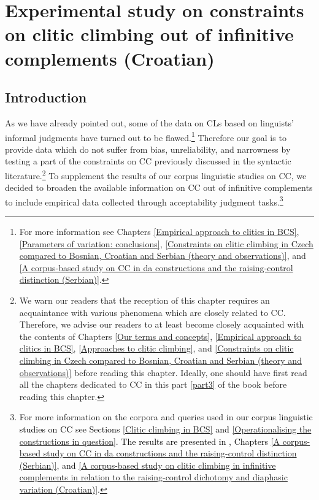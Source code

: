 
\chapter[Experimental study on clitic climbing out of infinitive complements]
        {Experimental study on constraints on clitic climbing out of infinitive complements (Croatian)}
\label{Experimental study on constraints on clitic climbing out of infinitive complements}

\largerpage
\section{Introduction}

As we have already pointed out, some of the data on CLs based on linguists’ informal judgments have turned out to be flawed.\footnote{For more information see Chapters \ref{Empirical approach to clitics in BCS}, \ref{Parameters of variation: conclusions}, \ref{Constraints on clitic climbing in Czech compared to Bosnian, Croatian and Serbian (theory and observations)}, and \ref{A corpus-based study on CC in da constructions and the raising-control distinction (Serbian)}.} Therefore our goal is to provide data which do not suffer from bias, unreliability, and narrowness by testing a part of the constraints on CC previously discussed in the syntactic literature.\footnote{We warn our readers that the reception of this chapter requires an acquaintance with various phenomena which are closely related to CC. Therefore, we advise our readers to at least become closely acquainted with the contents of Chapters \ref{Our terms and concepts}, \ref{Empirical approach to clitics in BCS}, \ref{Approaches to clitic climbing}, and \ref{Constraints on clitic climbing in Czech compared to Bosnian, Croatian and Serbian (theory and observations)} before reading this chapter. Ideally, one should have first read all the chapters dedicated to CC in this part \ref{part3} of the book before reading this chapter.} To supplement the results of our corpus linguistic studies on CC, we decided to broaden the available information on CC out of infinitive complements to include empirical data collected through acceptability judgment tasks.\footnote{For more information on the corpora and queries used in \textcolor{black}{our corpus linguistic studies on CC} see \textcolor{black}{Sections \ref{Clitic climbing in BCS} and \ref{Operationalising the constructions in question}. The results are presented in \citet*{HKJ18}, Chapters \ref{A corpus-based study on CC in da constructions and the raising-control distinction (Serbian)}, and \ref{A corpus-based study on clitic climbing in infinitive complements in relation to the raising-control dichotomy and diaphasic variation (Croatian)}.} }

